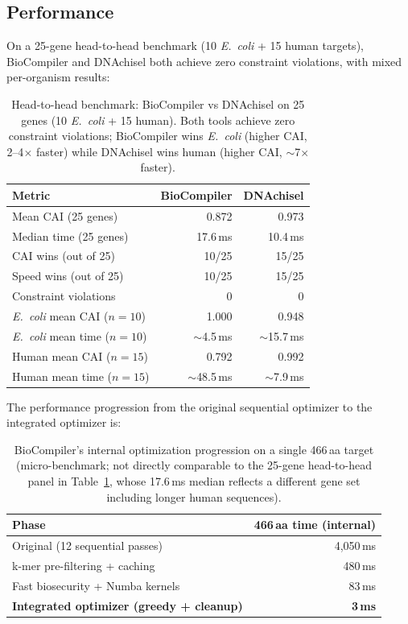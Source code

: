 \documentclass[11pt,a4paper]{article}
\theoremstyle{definition}
\begin{document}
\subsection{Performance}

On a 25-gene head-to-head benchmark (10 \emph{E.~coli} + 15 human targets), BioCompiler and DNAchisel both achieve zero constraint violations, with mixed per-organism results:

\begin{table}[!ht]
\centering
\begin{tabular}{lrr}
\toprule
\textbf{Metric} & \textbf{BioCompiler} & \textbf{DNAchisel} \\
\midrule
Mean CAI (25 genes) & 0.872 & 0.973 \\
Median time (25 genes) & 17.6\,ms & 10.4\,ms \\
CAI wins (out of 25) & 10/25 & 15/25 \\
Speed wins (out of 25) & 10/25 & 15/25 \\
Constraint violations & 0 & 0 \\
\midrule
\emph{E.~coli} mean CAI ($n=10$) & 1.000 & 0.948 \\
\emph{E.~coli} mean time ($n=10$) & $\sim$4.5\,ms & $\sim$15.7\,ms \\
Human mean CAI ($n=15$) & 0.792 & 0.992 \\
Human mean time ($n=15$) & $\sim$48.5\,ms & $\sim$7.9\,ms \\
\bottomrule
\end{tabular}
\caption{Head-to-head benchmark: BioCompiler vs DNAchisel on 25 genes (10 \emph{E.~coli} + 15 human). Both tools achieve zero constraint violations; BioCompiler wins \emph{E.~coli} (higher CAI, 2--4$\times$ faster) while DNAchisel wins human (higher CAI, $\sim$7$\times$ faster).}
\label{tab:benchmark}
\end{table}

The performance progression from the original sequential optimizer to the integrated optimizer is:

\begin{table}[!ht]
\centering
\begin{tabular}{lr}
\toprule
\textbf{Phase} & \textbf{466\,aa time (internal)} \\
\midrule
Original (12 sequential passes) & 4{,}050\,ms \\
k-mer pre-filtering + caching & 480\,ms \\
Fast biosecurity + Numba kernels & 83\,ms \\
\textbf{Integrated optimizer (greedy + cleanup)} & \textbf{3\,ms} \\
\bottomrule
\end{tabular}
\caption{BioCompiler's internal optimization progression on a single 466\,aa target (micro-benchmark; not directly comparable to the 25-gene head-to-head panel in Table~\ref{tab:benchmark}, whose 17.6\,ms median reflects a different gene set including longer human sequences).}
\label{tab:progression}
\end{table}
\end{document}
